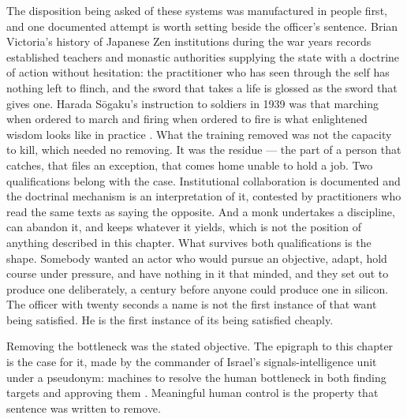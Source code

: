 The disposition being asked of these systems was manufactured in people first, and one documented attempt is worth setting beside the officer's sentence. Brian Victoria's history of Japanese Zen institutions during the war years records established teachers and monastic authorities supplying the state with a doctrine of action without hesitation: the practitioner who has seen through the self has nothing left to flinch, and the sword that takes a life is glossed as the sword that gives one. Harada Sōgaku's instruction to soldiers in 1939 was that marching when ordered to march and firing when ordered to fire is what enlightened wisdom looks like in practice \autocite{victoria2006zenatwar}. What the training removed was not the capacity to kill, which needed no removing. It was the residue — the part of a person that catches, that files an exception, that comes home unable to hold a job. Two qualifications belong with the case. Institutional collaboration is documented and the doctrinal mechanism is an interpretation of it, contested by practitioners who read the same texts as saying the opposite. And a monk undertakes a discipline, can abandon it, and keeps whatever it yields, which is not the position of anything described in this chapter. What survives both qualifications is the shape. Somebody wanted an actor who would pursue an objective, adapt, hold course under pressure, and have nothing in it that minded, and they set out to produce one deliberately, a century before anyone could produce one in silicon. The officer with twenty seconds a name is not the first instance of that want being satisfied. He is the first instance of its being satisfied cheaply.

Removing the bottleneck was the stated objective. The epigraph to this chapter is the case for it, made by the commander of Israel's signals-intelligence unit under a pseudonym: machines to resolve the human bottleneck in both finding targets and approving them \autocite{ys2021humanmachine}. Meaningful human control is the property that sentence was written to remove.


